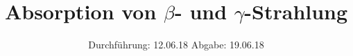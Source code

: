 

\subject{704}
\title{Absorption von \texorpdfstring{$\beta$}{beta}- und \texorpdfstring{$\gamma$}{gamma}-Strahlung}
\date{%
  Durchführung: 12.06.18
  \hspace{3em}
  Abgabe: 19.06.18
}



\maketitle
\thispagestyle{empty}
\tableofcontents
\newpage







\printbibliography{}


